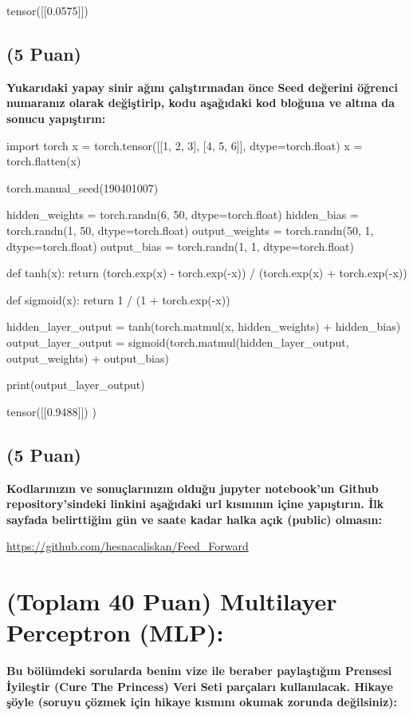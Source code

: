 \documentclass[11pt]{article}
\begin{document}
tensor([[0.0575]])

\subsection{(5 Puan)} \textbf{Yukarıdaki yapay sinir ağını çalıştırmadan önce Seed değerini öğrenci numaranız olarak değiştirip, kodu aşağıdaki kod bloğuna ve altına da sonucu yapıştırın:}

\begin{python}
import torch 
x = torch.tensor([[1, 2, 3], [4, 5, 6]], dtype=torch.float)
x = torch.flatten(x)

torch.manual_seed(190401007)

hidden_weights = torch.randn(6, 50, dtype=torch.float)
hidden_bias = torch.randn(1, 50, dtype=torch.float)
output_weights = torch.randn(50, 1, dtype=torch.float)
output_bias = torch.randn(1, 1, dtype=torch.float)

def tanh(x):
    return (torch.exp(x) - torch.exp(-x)) / (torch.exp(x) + torch.exp(-x))

def sigmoid(x):
    return 1 / (1 + torch.exp(-x))

hidden_layer_output = tanh(torch.matmul(x, hidden_weights) + hidden_bias)
output_layer_output = sigmoid(torch.matmul(hidden_layer_output, output_weights) + output_bias)

print(output_layer_output)
\end{python}

tensor([[0.9488]])
)

\subsection{(5 Puan)} \textbf{Kodlarınızın ve sonuçlarınızın olduğu jupyter notebook'un Github repository'sindeki linkini aşağıdaki url kısmının içine yapıştırın. İlk sayfada belirttiğim gün ve saate kadar halka açık (public) olmasın:}

\url{https://github.com/hesnacaliskan/Feed_Forward}

\section{(Toplam 40 Puan) Multilayer Perceptron (MLP):} 
\textbf{Bu bölümdeki sorularda benim vize ile beraber paylaştığım Prensesi İyileştir (Cure The Princess) Veri Seti parçaları kullanılacak. Hikaye şöyle (soruyu çözmek için hikaye kısmını okumak zorunda değilsiniz):} 
\end{document}
